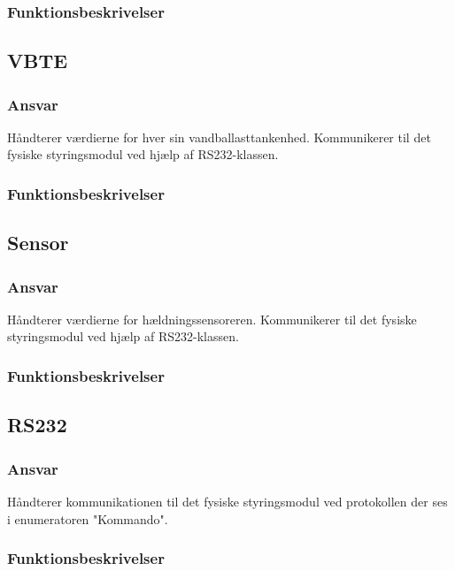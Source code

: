 \subsubsection{Funktionsbeskrivelser}


\subsection{VBTE}
\subsubsection{Ansvar}
Håndterer værdierne for hver sin vandballasttankenhed. Kommunikerer til det fysiske styringsmodul ved hjælp af RS232-klassen.
\subsubsection{Funktionsbeskrivelser}

\subsection{Sensor}
\subsubsection{Ansvar}
Håndterer værdierne for hældningssensoreren. Kommunikerer til det fysiske styringsmodul ved hjælp af RS232-klassen.
\subsubsection{Funktionsbeskrivelser}

\subsection{RS232}
\subsubsection{Ansvar}
Håndterer kommunikationen til det fysiske styringsmodul ved protokollen der ses i enumeratoren "Kommando". 
\subsubsection{Funktionsbeskrivelser}